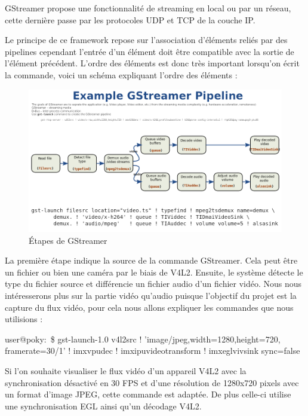 GStreamer propose une fonctionnalité de streaming en local ou par un réseau, cette
dernière passe par les protocoles UDP et TCP de la couche IP.\medskip

Le principe de ce framework repose sur l’association d’éléments reliés par des pipelines
cependant l’entrée d’un élément doit être compatible avec la sortie de l’élément précédent.
L’ordre des éléments est donc très important lorsqu’on écrit la commande, voici un
schéma expliquant l’ordre des éléments :

\begin{figure}[!htb]
    \centering
    \includegraphics[trim={0cm 5cm 0cm 6cm},clip,scale=0.35]{Figures/gstreamer.png}
    \decoRule
    \caption{Étapes de GStreamer} \label{fig:gstreamer}
\end{figure}

La première étape indique la source de la commande GStreamer. Cela peut être un fichier
ou bien une caméra par le biais de V4L2. Ensuite, le système détecte le type du fichier
source et différencie un fichier audio d’un fichier vidéo.
Nous nous intéresserons plus sur la partie vidéo qu’audio puisque l’objectif du projet est la
capture du flux vidéo, pour cela nous allons expliquer les commandes que nous utilisions :

\begin{tcolorbox}
    user@poky:~\$ gst-launch-1.0 v4l2src ! 'image/jpeg,width=1280,height=720,
    framerate=30/1' ! imxvpudec ! imxipuvideotransform ! imxeglvivsink sync=false
\end{tcolorbox}

Si l’on souhaite visualiser le flux vidéo d’un appareil V4L2 avec la synchronisation
désactivé en 30 FPS et d’une résolution de 1280x720 pixels avec un format d’image
JPEG, cette commande est adaptée. De plus celle-ci utilise une synchronisation EGL ainsi
qu’un décodage V4L2.

